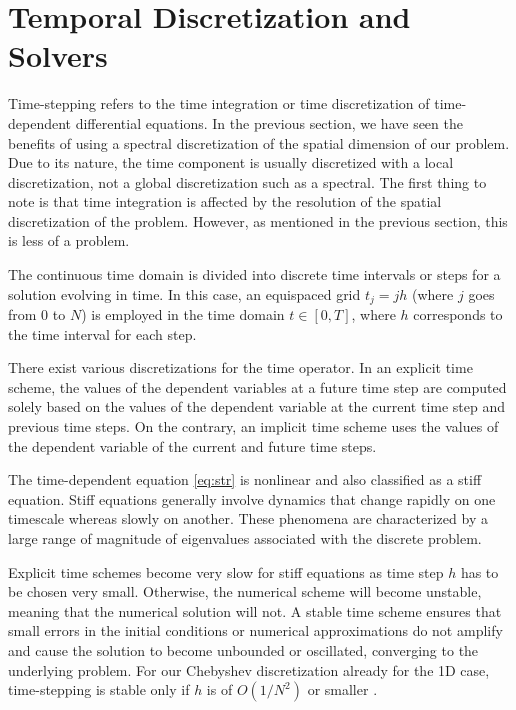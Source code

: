 
\section{Temporal Discretization and Solvers} \label{sec:time}

Time-stepping refers to the time integration or time discretization of
time-dependent differential equations. In the previous section, we have seen
the benefits of using a spectral discretization of the spatial dimension of our
problem. Due to its nature, the time component is usually discretized with a
local discretization, not a global discretization such as a spectral. The first
thing to note is that time integration is affected by the resolution of the
spatial discretization of the problem. However, as mentioned in the previous
section, this is less of a problem. 

The continuous time domain is divided into discrete time intervals or steps for
a solution evolving in time. In this case, an equispaced grid $t_j = jh$ (where
$j$ goes from $0$ to $N$) is employed in the time domain $t \in [0, T]$, where
$h$ corresponds to the time interval for each step.

There exist various discretizations for the time operator. In an explicit time
scheme, the values of the dependent variables at a future time step are
computed solely based on the values of the dependent variable at the current
time step and previous time steps. On the contrary, an implicit time scheme
uses the values of the dependent variable of the current and future time steps.

The time-dependent equation \eqref{eq:str} is nonlinear and also classified as
a stiff equation. Stiff equations generally involve dynamics that change
rapidly on one timescale whereas slowly on another. These phenomena are
characterized by a large range of magnitude of eigenvalues associated with the
discrete problem.

Explicit time schemes become very slow for stiff equations as time step $h$ has
to be chosen very small. Otherwise, the numerical scheme will become unstable,
meaning that the numerical solution will not. A stable time scheme ensures that
small errors in the initial conditions or numerical approximations do not
amplify and cause the solution to become unbounded or oscillated, converging to
the underlying problem. For our Chebyshev discretization already for the 1D
case, time-stepping is stable only if $h$ is of $O(1/N^2)$ or smaller
\citep{boyd2001}.

